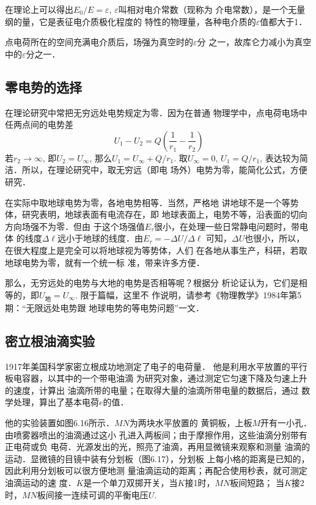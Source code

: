 在理论上可以得出$E_0/E=\varepsilon$, $\varepsilon$叫相对电介常数（现称为
介电常数），是一个无量纲的量，它是表征电介质极化程度的
特性的物理量，各种电介质的$\varepsilon$值都大于1．

点电荷所在的空间充满电介质后，场强为真空时的$\varepsilon$分
之一，故库仑力减小为真空中的$\varepsilon$分之一．

\subsection{零电势的选择}
在理论研究中常把无穷远处电势规定为零．因为在普通
物理学中，点电荷电场中任两点间的电势差
\[U_1-U_2=Q\left(\frac{1}{r_1}-\frac{1}{r_2}\right)\]
若$r_2\to \infty$, 即$U_2=U_{\infty}$, 那么$U_1=U_{\infty}+Q/r_1$. 取$U_{\infty}=0$, $U_1=Q/r_1$, 表达较为简洁．所以，在理论研究中，取无穷远（即电
场外）电势为零，能简化公式，方便研究．

在实际中取地球电势为零，各地电势相等．当然，严格地
讲地球不是一个等势体，研究表明，地球表面有电流存在，即
地球表面上，电势不等，沿表面的切向方向场强不为零．但由
于这个场强值$E_{\tau}$很小，在处理一些日常静电问题时，带电体
的线度$\Delta \ell$远小于地球的线度．由$E_{\tau}=-\Delta U/\Delta \ell$
可知，$\Delta U$也很小，所以，在很大程度上是完全可以将地球视为等势体，人们
在各地从事生产，科研，若取地球电势为零，就有一个统一标
准，带来许多方便．

那么，无穷远处的电势与大地的电势是否相等呢？根据分
析论证认为，它们是相等的，即$U_{\text{地}}=U_{\infty}$. 限于篇幅，这里不
作说明，请参考《物理教学》1984年第5期：“无限远处电势跟
地球电势的等电势问题”一文．

\subsection{密立根油滴实验}
1917年美国科学家密立根成功地测定了电子的电荷量．
他是利用水平放置的平行板电容器，以其中的一个带电油滴
为研究对象，通过测定它匀速下降及匀速上升的速度，计算出
油滴所带的电量；在取得大量的油滴所带电量的数据后，通过
数学处理，算出了基本电荷$e$的值．

他的实验装置如图6.16所示．$MN$为两块水平放置的
黄铜板，上板$M$开有一小孔．由喷雾器喷出的油滴通过这小
孔进入两板间；由于摩擦作用，这些油滴分别带有正电荷或负
电荷．光源发出的光，照亮了油滴，再用显微镜来观察和测量
油滴的运动．显微镜的目镜中装有分划板（图6.17），分划板
上每小格的距离是已知的，因此利用分划板可以很方便地测
量油滴运动的距离；再配合使用秒表，就可测定油滴运动的速
度．$K$是一个单刀双掷开关，当$K$接1时，$MN$板间短路；
当$K$接2时，$MN$板间接一连续可调的平衡电压$U$.

